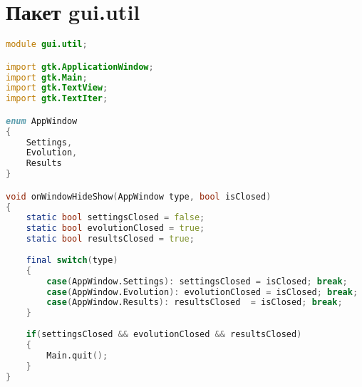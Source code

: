 \documentclass[russian,utf8,emptystyle]{eskdtext}
\begin{document}
\section{Пакет gui.util}
\begin{lstlisting}[language=D]
module gui.util;

import gtk.ApplicationWindow;
import gtk.Main;
import gtk.TextView;
import gtk.TextIter;

enum AppWindow
{
    Settings,
    Evolution,
    Results
}

void onWindowHideShow(AppWindow type, bool isClosed)
{
    static bool settingsClosed = false;
    static bool evolutionClosed = true;
    static bool resultsClosed = true;
    
    final switch(type)
    {
        case(AppWindow.Settings): settingsClosed = isClosed; break;
        case(AppWindow.Evolution): evolutionClosed = isClosed; break;
        case(AppWindow.Results): resultsClosed  = isClosed; break;
    } 
    
    if(settingsClosed && evolutionClosed && resultsClosed)
    {
        Main.quit();
    }
}
\end{lstlisting}
\end{document}
